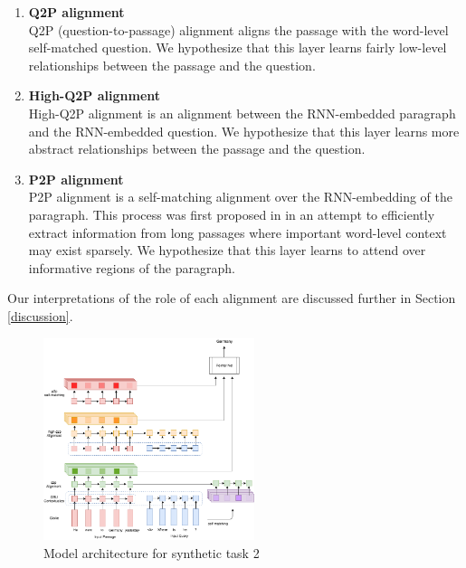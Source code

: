 \documentclass{article}
\begin{document}
\begin{enumerate}
	\item \textbf{Q2P alignment} \\
	Q2P (question-to-passage) alignment aligns the passage with the word-level self-matched question. We hypothesize that this layer learns fairly low-level relationships between the passage and the question.
	
	\item \textbf{High-Q2P alignment} \\
	High-Q2P alignment is an alignment between the RNN-embedded paragraph and the RNN-embedded question. We hypothesize that this layer learns more abstract relationships between the passage and the question.
	
	\item \textbf{P2P alignment} \\
	P2P alignment is a self-matching alignment over the RNN-embedding of the paragraph. This process was first proposed in \cite{RNet} in an attempt to efficiently extract information from long passages where important word-level context may exist sparsely. We hypothesize that this layer learns to attend over informative regions of the paragraph. 
\end{enumerate}
 
Our interpretations of the role of each alignment are discussed further in Section \ref{discussion}. \\

\begin{figure}[h]
	\includegraphics[width=0.55\textwidth]{model.png}
	\centering
	\caption{Model architecture for synthetic task 2}
	\label{fig:QA_model}
\end{figure}
\end{document}
